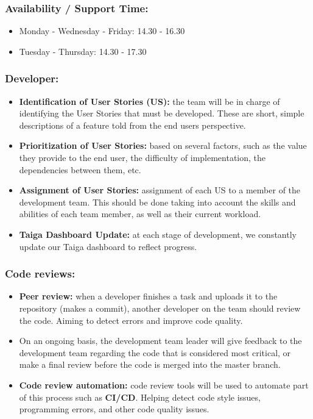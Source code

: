 \documentclass{article}
\providecommand{\tightlist}{
  \setlength{\itemsep}{0pt}\setlength{\parskip}{0pt}}
\begin{document}
\hypertarget{availabilitysupporttime}{
\subsubsection{Availability / Support
Time:}\label{availabilitysupporttime}}

\begin{itemize}
\tightlist
\item
  Monday - Wednesday - Friday: 14.30 - 16.30
\item
  Tuesday - Thursday: 14.30 - 17.30
\end{itemize}

\hypertarget{developer}{
\subsubsection{Developer:}\label{developer}}

\begin{itemize}
\tightlist
\item
  \textbf{Identification of User Stories (US):} the team will be in
  charge of identifying the User Stories that must be developed. These
  are short, simple descriptions of a feature told from the end
  user\textquotesingle s perspective.
\item
  \textbf{Prioritization of User Stories:} based on several factors,
  such as the value they provide to the end user, the difficulty of
  implementation, the dependencies between them, etc.
\item
  \textbf{Assignment of User Stories:} assignment of each US to a member
  of the development team. This should be done taking into account the
  skills and abilities of each team member, as well as their current
  workload.
\item
  \textbf{Taiga Dashboard Update:} at each stage of development, we
  constantly update our Taiga dashboard to reflect progress.
\end{itemize}

\hypertarget{codereviewsnbsp}{
\subsubsection{Code reviews:~}\label{codereviewsnbsp}}

\begin{itemize}
\tightlist
\item
  \textbf{Peer review:} when a developer finishes a task and uploads it
  to the repository (makes a commit), another developer on the team
  should review the code. Aiming to detect errors and improve code
  quality.
\item
  On an ongoing basis, the development team leader will give feedback to
  the development team regarding the code that is considered most
  critical, or make a final review before the code is merged into the
  master branch.
\item
  \textbf{Code review automation:} code review tools will be used to
  automate part of this process such as \textbf{CI/CD}. Helping detect
  code style issues, programming errors, and other code quality issues.
\end{itemize}
\end{document}
